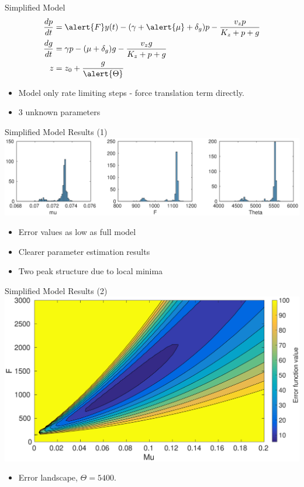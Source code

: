 \documentclass{beamer}
\begin{document}
\begin{frame}{Simplified Model}
\begin{align}
\frac{dp}{dt} & = \alert{F}y(t)-(\gamma + \alert{\mu} + \delta_{g})p - \frac{v_{z}p}{K_{z}+p+g}   \\
\frac{dg}{dt} & = \gamma p - (\mu + \delta_{g})g - \frac{v_{z}g}{K_{z}+p+g}  \\
z &= z_{0} +\frac{g}{\alert{\Theta}} 
\end{align}
\begin{itemize}
\item  Model only rate limiting steps - force translation term directly.
\item 3 unknown parameters
\end{itemize}
\end{frame}


\begin{frame}{Simplified Model Results (1)}
  \includegraphics[scale = 0.28, clip = true, trim = 100 0 0 400]{../Figures/13_9_hist_simplified}
  \begin{itemize}
\item  Error values as low as full model
\item Clearer parameter estimation results
\item Two peak structure due to local minima
\end{itemize}
\end{frame}

\begin{frame}{Simplified Model Results (2)}
  \includegraphics[scale = 0.25, clip = true, trim = 0 0 0 0]{Figures/Likelihood_rough_presentation}
    \begin{itemize}
\item  Error landscape, $\Theta = 5400$.
\end{itemize}
\end{frame}
\end{document}
